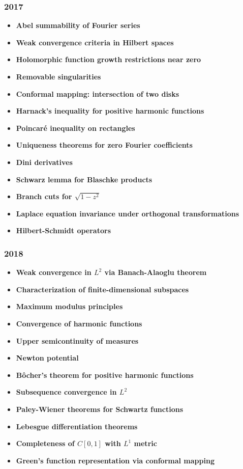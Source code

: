 \subsubsection*{2017}
\begin{itemize}
    \item \textbf{Abel summability of Fourier series}
    \item \textbf{Weak convergence criteria in Hilbert spaces}
    \item \textbf{Holomorphic function growth restrictions near zero}
    \item \textbf{Removable singularities}
    \item \textbf{Conformal mapping: intersection of two disks}
    \item \textbf{Harnack's inequality for positive harmonic functions}
    \item \textbf{Poincar\'e inequality on rectangles}
    \item \textbf{Uniqueness theorems for zero Fourier coefficients}
    \item \textbf{Dini derivatives}
    \item \textbf{Schwarz lemma for Blaschke products}
    \item \textbf{Branch cuts for $\sqrt{1-z^2}$}
    \item \textbf{Laplace equation invariance under orthogonal transformations}
    \item \textbf{Hilbert-Schmidt operators}
\end{itemize}

\subsubsection*{2018}
\begin{itemize}
    \item \textbf{Weak convergence in $L^2$ via Banach-Alaoglu theorem}
    \item \textbf{Characterization of finite-dimensional subspaces}
    \item \textbf{Maximum modulus principles}
    \item \textbf{Convergence of harmonic functions}
    \item \textbf{Upper semicontinuity of measures}
    \item \textbf{Newton potential}
    \item \textbf{B\^ocher's theorem for positive harmonic functions}
    \item \textbf{Subsequence convergence in $L^2$}
    \item \textbf{Paley-Wiener theorems for Schwartz functions}
    \item \textbf{Lebesgue differentiation theorems}
    \item \textbf{Completeness of $C[0,1]$ with $L^1$ metric}
    \item \textbf{Green's function representation via conformal mapping}
\end{itemize}

